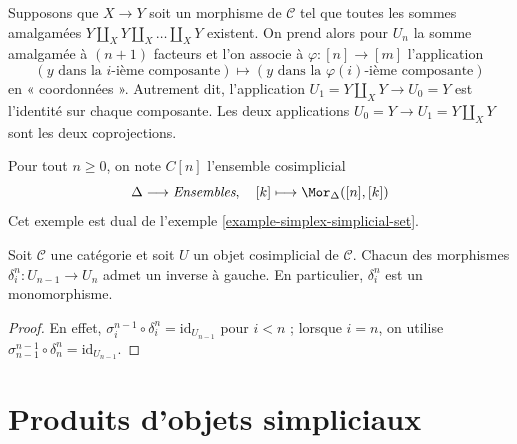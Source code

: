 \begin{example}
\label{example-push-outs-simplicial-object}
Supposons que $X\to Y$ soit un morphisme de $\mathcal{C}$ tel que toutes les
sommes amalgamées $Y\amalg_X Y \amalg_X \ldots \amalg_X Y$ existent.
On prend alors pour $U_n$ la somme amalgamée à $(n + 1)$ facteurs et
l'on associe à $\varphi : [n] \to [m]$ l'application
$$
(y \text{ dans la }i\text{-ième composante})
\mapsto
(y \text{ dans la }\varphi(i)\text{-ième composante})
$$
en « coordonnées ». Autrement dit, l'application
$U_1 = Y \amalg_X Y \to U_0 = Y$ est l'identité sur chaque composante.
Les deux applications $U_0 = Y \to U_1 = Y \amalg_X Y$ sont les deux
coprojections.
\end{example}

\begin{example}
\label{example-simplex-cosimplicial-set}
Pour tout $n \geq 0$, on note $C[n]$ l'ensemble cosimplicial
$$
\Delta \longrightarrow \textit{Ensembles},\quad
[k] \longmapsto \Mor_{\Delta}([n], [k])
$$
Cet exemple est dual de l'exemple \ref{example-simplex-simplicial-set}.
\end{example}

\begin{lemma}
\label{lemma-di-injective}
Soit $\mathcal{C}$ une catégorie et soit $U$ un objet cosimplicial de
$\mathcal{C}$. Chacun des morphismes $\delta^n_i : U_{n - 1} \to U_n$
admet un inverse à gauche. En particulier, $\delta^n_i$ est un
monomorphisme.
\end{lemma}

\begin{proof}
En effet,
$\sigma_i^{n - 1} \circ \delta^n_i = \text{id}_{U_{n - 1}}$
pour $i < n$ ; lorsque $i = n$, on utilise
$\sigma_{n - 1}^{n - 1} \circ \delta^n_n = \text{id}_{U_{n - 1}}$.
\end{proof}


























\section{Produits d'objets simpliciaux}
\label{section-products}

